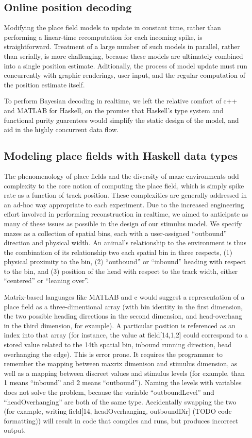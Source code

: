 \documentclass[10pt]{article}
\begin{document}
\subsection*{Online position decoding}
Modifying the place field models to update in constant time, rather than performing a linear-time recomputation for each incoming spike, is straightforward. Treatment of a large number of such models in parallel, rather than serially, is more challenging, because these models are ultimately combined into a single position estimate. Aditionally, the process of model update must run concurrently with graphic renderings, user input, and the regular computation of the position estimate itself.

To perform Bayesian decoding in realtime, we left the relative comfort of c++ and MATLAB for Haskell, on the promise that Haskell's type system and functional purity guarentees would simplify the static design of the model, and aid in the highly concurrent data flow. 

\subsection*{Modeling place fields with Haskell data types}
The phenomenology of place fields and the diversity of maze environments add complexity to the core notion of computing the place field, which is simply spike rate as a function of track position. These complexities are generally addressed in an ad-hoc way appropriate to each experiment. Due to the increased engineering effort involved in performing reconstruction in realtime, we aimed to anticipate as many of these issues as possible in the design of our stimulus model. We specify mazes as a collection of spatial bins, each with a user-assigned ``outbound'' direction and physical width. An animal's relationship to the environment is thus the combination of its relationship two each spatial bin in three respects, (1) physical proximity to the bin, (2) ``outbound'' or ``inbound'' heading with respect to the bin, and (3) position of the head with respect to the track width, either ``centered'' or ``leaning over''.

Matrix-based languages like MATLAB and c would suggest a representation of a place field as a three-dimentional array (with bin identity in the first dimension, the two possible heading directions in the second dimension, and head-overhang in the third dimension, for example). A particular position is referenced as an index into that array (for instance, the value at field[14,1,2] could correspond to a stored value related to the 14th spatial bin, inbound running direction, head overhanging the edge). This is error prone. It requires the programmer to remember the mapping between maxrix dimenison and stimulus dimension, as well as a mapping between discreet values and stimulus levels (for example, than 1 means ``inbound'' and 2 means ``outbound''). Naming the levels with variables does not solve the problem, because the variable ``outboundLevel'' and ``headOverhanging'' are both of the same type. Accidentally swapping the two (for example, writing field[14, headOverhanging, outboundDir] (TODO code formatting)) will result in code that compiles and runs, but produces incorrect output.
\end{document}
